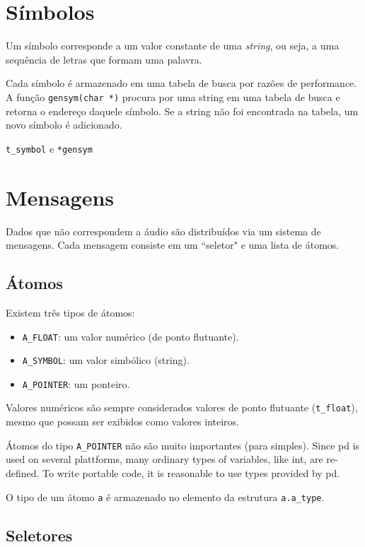 \section{Símbolos}

Um símbolo corresponde a um valor constante de uma \emph{string}, ou seja, a
uma sequência de letras que formam uma palavra.

Cada símbolo é armazenado em uma tabela de busca por razões de performance. A
função \texttt{gensym(char *)} procura por uma string em uma tabela de busca e
retorna o endereço daquele símbolo. Se a string não foi encontrada na tabela,
um novo símbolo é adicionado.


\texttt{t\_symbol} e \texttt{*gensym}

\section{Mensagens}

Dados que não correspondem a áudio são distribuídos via um sistema de
mensagens. Cada mensagem consiste em um ``seletor" e uma lista de átomos.

\subsection{Átomos}

Existem três tipos de átomos:

\begin{itemize}
\item \texttt{A\_FLOAT}: um valor numérico (de ponto flutuante).
\item \texttt{A\_SYMBOL}: um valor simbólico (string).
\item \texttt{A\_POINTER}: um ponteiro.
\end{itemize}

Valores numéricos são sempre considerados valores de ponto flutuante
(\texttt{t\_float}), mesmo que possam ser exibidos como valores inteiros.

Átomos do tipo \texttt{A\_POINTER} não são muito importantes (para \externals
simples).
Since pd is used on several plattforms, many ordinary types of variables, like int, are re-defined. To write portable code, it is reasonable to use types provided by pd.

O tipo de um átomo \texttt{a} é armazenado no elemento da estrutura
\texttt{a.a\_type}.

\subsection{Seletores}

